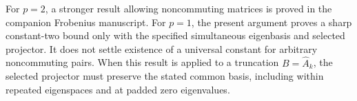 \documentclass[11pt]{article}
\theoremstyle{definition}
\begin{document}
For $p=2$, a stronger result allowing noncommuting matrices is proved in the companion Frobenius manuscript. For $p=1$, the present argument proves a sharp constant-two bound only with the specified simultaneous eigenbasis and selected projector. It does not settle existence of a universal constant for arbitrary noncommuting pairs. When this result is applied to a truncation $B=\widehat A_k$, the selected projector must preserve the stated common basis, including within repeated eigenspaces and at padded zero eigenvalues.
\end{document}
